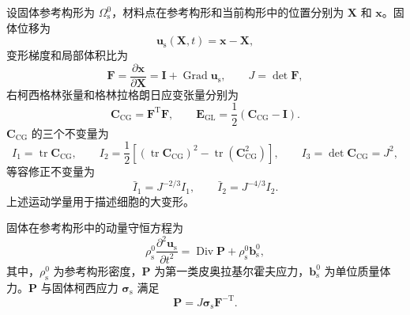 设固体参考构形为 $\Omega_{\mathrm s}^0$，材料点在参考构形和当前构形中的位置分别为 $\boldsymbol{X}$ 和 $\boldsymbol{x}$。固体位移为
\begin{equation}
\boldsymbol{u}_{\mathrm s}(\boldsymbol{X},t)
=
\boldsymbol{x}-\boldsymbol{X},
\label{eq:ch2_solid_motion}
\end{equation}
变形梯度和局部体积比为
\begin{equation}
\boldsymbol{F}
=
\frac{\partial\boldsymbol{x}}{\partial\boldsymbol{X}}
=
\boldsymbol{I}
+
\operatorname{Grad}\boldsymbol{u}_{\mathrm s},
\qquad
J=\det\boldsymbol{F},
\label{eq:ch2_deformation_gradient}
\end{equation}
右柯西格林张量和格林拉格朗日应变张量分别为
\begin{equation}
\boldsymbol{C}_{\mathrm{CG}}
=
\boldsymbol{F}^{\mathrm T}\boldsymbol{F},
\qquad
\boldsymbol{E}_{\mathrm{GL}}
=
\frac{1}{2}
\left(\boldsymbol{C}_{\mathrm{CG}}-\boldsymbol{I}\right).
\label{eq:ch2_strain_tensors}
\end{equation}
$\boldsymbol{C}_{\mathrm{CG}}$ 的三个不变量为
\begin{equation}
I_1=\operatorname{tr}\boldsymbol{C}_{\mathrm{CG}},
\qquad
I_2=\frac{1}{2}
\left[
\left(\operatorname{tr}\boldsymbol{C}_{\mathrm{CG}}\right)^2
-
\operatorname{tr}\left(\boldsymbol{C}_{\mathrm{CG}}^2\right)
\right],
\qquad
I_3=\det\boldsymbol{C}_{\mathrm{CG}}=J^2,
\label{eq:ch2_invariants}
\end{equation}
等容修正不变量为
\begin{equation}
\bar I_1=J^{-2/3}I_1,
\qquad
\bar I_2=J^{-4/3}I_2.
\label{eq:ch2_modified_invariants}
\end{equation}
上述运动学量用于描述细胞的大变形\cite{holzapfel2000nonlinear,ogden1997nonlinear,bonet2008nonlinear}。

固体在参考构形中的动量守恒方程为
\begin{equation}
\rho_{\mathrm s}^0
\frac{\partial^2\boldsymbol{u}_{\mathrm s}}{\partial t^2}
=
\operatorname{Div}\boldsymbol{P}
+
\rho_{\mathrm s}^0\boldsymbol{b}_{\mathrm s}^0,
\label{eq:ch2_solid_momentum_reference}
\end{equation}
其中，$\rho_{\mathrm s}^0$ 为参考构形密度，$\boldsymbol{P}$ 为第一类皮奥拉基尔霍夫应力，$\boldsymbol{b}_{\mathrm s}^0$ 为单位质量体力。$\boldsymbol{P}$ 与固体柯西应力 $\boldsymbol{\sigma}_{\mathrm s}$ 满足
\begin{equation}
\boldsymbol{P}
=
J\boldsymbol{\sigma}_{\mathrm s}\boldsymbol{F}^{-\mathrm T}.
\label{eq:ch2_stress_transform}
\end{equation}

